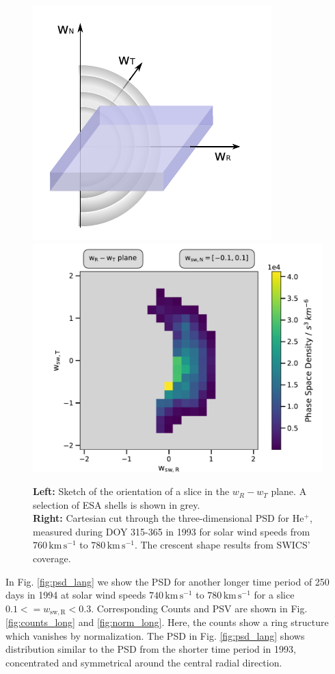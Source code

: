 \begin{figure}[h]
	\includegraphics[width=.34\textwidth]{Figures/sketch_slice_N2.pdf}
	\includegraphics[width=.64\textwidth]{Figures/slice_50_N.pdf}
	\centering
	\caption{\textbf{Left:} Sketch of the orientation of a slice in the $w_R - w_T$ plane. A selection of ESA shells is shown in grey.\\ \textbf{Right:} Cartesian cut through the three-dimensional PSD for $\mathrm{He^{+}}$, measured during DOY 315-365 in 1993 for solar wind speeds from $760 \, \mathrm{km\,s^{-1}}$ to $780 \, \mathrm{km\,s^{-1}}$. The crescent shape results from SWICS' coverage.}
	\label{fig:sketch_slice_N}
\end{figure}
%
%
%
%
%
\clearpage
\noindent In Fig. \ref{fig:psd_lang} we show the PSD for another longer time period of 250 days in 1994 at solar wind speeds $740 \, \mathrm{km\,s^{-1}}$ to $780 \, \mathrm{km\,s^{-1}}$ for a slice $0.1 <= w_\mathrm{sw,R} < 0.3$. Corresponding Counts and PSV are shown in Fig. \ref{fig:counts_long} and \ref{fig:norm_long}. Here, the counts show a ring structure which vanishes by normalization. 
The PSD in  Fig. \ref{fig:psd_lang} shows distribution similar to the PSD from the shorter time period in 1993, concentrated and symmetrical around the central radial direction.
